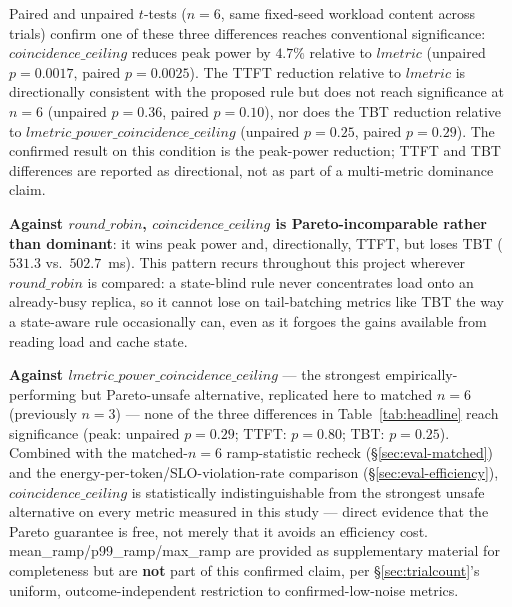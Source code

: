 \documentclass[sigconf,review,anonymous]{acmart}
\begin{document}
Paired and unpaired $t$-tests ($n{=}6$, same fixed-seed workload content across trials)
confirm one of these three differences reaches conventional significance:
$\mathit{coincidence\_ceiling}$ reduces peak power by $4.7\%$ relative to $\mathit{lmetric}$
(unpaired $p{=}0.0017$, paired $p{=}0.0025$). The TTFT reduction relative to $\mathit{lmetric}$
is directionally consistent with the proposed rule but does not reach significance at $n{=}6$
(unpaired $p{=}0.36$, paired $p{=}0.10$), nor does the TBT reduction relative to
$\mathit{lmetric\_power\_coincidence\_ceiling}$ (unpaired $p{=}0.25$, paired $p{=}0.29$). The
confirmed result on this condition is the peak-power reduction; TTFT and TBT differences are
reported as directional, not as part of a multi-metric dominance claim.

\textbf{Against $\mathit{round\_robin}$, $\mathit{coincidence\_ceiling}$ is Pareto-incomparable
rather than dominant}: it wins peak power and, directionally, TTFT, but loses TBT ($531.3$
vs.\ $502.7$~ms). This pattern recurs throughout this project wherever $\mathit{round\_robin}$
is compared: a state-blind rule never concentrates load onto an already-busy replica, so it
cannot lose on tail-batching metrics like TBT the way a state-aware rule occasionally can,
even as it forgoes the gains available from reading load and cache state.

\textbf{Against $\mathit{lmetric\_power\_coincidence\_ceiling}$} --- the strongest
empirically-performing but Pareto-unsafe alternative, replicated here to matched $n{=}6$
(previously $n{=}3$) --- none of the three differences in Table~\ref{tab:headline} reach
significance (peak: unpaired $p{=}0.29$; TTFT: $p{=}0.80$; TBT: $p{=}0.25$). Combined with the
matched-$n{=}6$ ramp-statistic recheck (\S\ref{sec:eval-matched}) and the
energy-per-token/SLO-violation-rate comparison (\S\ref{sec:eval-efficiency}),
$\mathit{coincidence\_ceiling}$ is statistically indistinguishable from the strongest unsafe
alternative on every metric measured in this study --- direct evidence that the Pareto
guarantee is free, not merely that it avoids an efficiency cost. mean\_ramp/p99\_ramp/max\_ramp
are provided as supplementary material for completeness but are \textbf{not} part of this
confirmed claim, per \S\ref{sec:trialcount}'s uniform, outcome-independent restriction to
confirmed-low-noise metrics.
\end{document}
